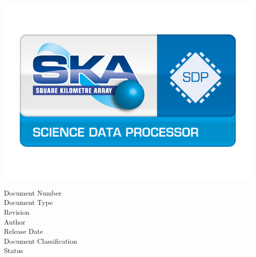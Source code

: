 \thispagestyle{empty}


\setlength{\unitlength}{1mm}


\begin{center}
  \includegraphics[width=\textwidth]{science_data_processor_logo.jpg}

  \fontsize{22}{24}\selectfont\sffamily%
  \bigdoctitle
\end{center}

\vspace*{\fill}

\noindent\normalsize{Document Number \dotfill \docnr}\\
\normalsize{Document Type \dotfill \doctype}\\
\normalsize{Revision \dotfill \revision}\\
\normalsize{Author \dotfill \docauthor}\\
\normalsize{Release Date \dotfill \docudate}\\
\normalsize{Document Classification \dotfill \classification}\\
\normalsize{Status \dotfill \docstatus}


\begin{center}
\end{center}


